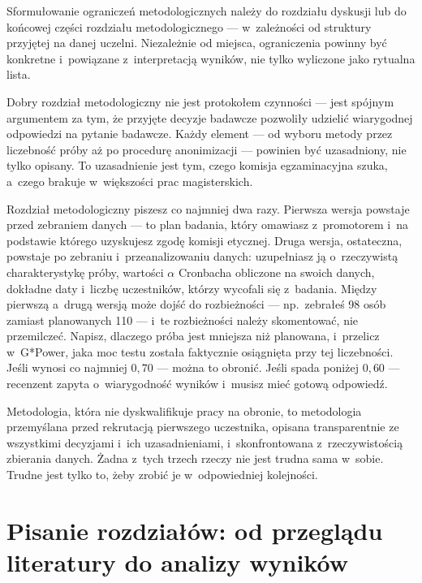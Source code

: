 \documentclass[12pt,a4paper,twoside,openany]{book}
\begin{document}
Sformułowanie ograniczeń metodologicznych należy do rozdziału dyskusji lub do końcowej części rozdziału metodologicznego --- w~zależności od struktury przyjętej na danej uczelni. Niezależnie od miejsca, ograniczenia powinny być konkretne i~powiązane z~interpretacją wyników, nie tylko wyliczone jako rytualna lista.

\begin{keyinsight}
Dobry rozdział metodologiczny nie jest protokołem czynności --- jest spójnym argumentem za tym, że przyjęte decyzje badawcze pozwoliły udzielić wiarygodnej odpowiedzi na pytanie badawcze. Każdy element --- od wyboru metody przez liczebność próby aż po procedurę anonimizacji --- powinien być uzasadniony, nie tylko opisany. To uzasadnienie jest tym, czego komisja egzaminacyjna szuka, a~czego brakuje w~większości prac magisterskich.
\end{keyinsight}

Rozdział metodologiczny piszesz co najmniej dwa razy. Pierwsza wersja powstaje przed zebraniem danych --- to plan badania, który omawiasz z~promotorem i~na podstawie którego uzyskujesz zgodę komisji etycznej. Druga wersja, ostateczna, powstaje po zebraniu i~przeanalizowaniu danych: uzupełniasz ją o~rzeczywistą charakterystykę próby, wartości $\alpha$ Cronbacha obliczone na swoich danych, dokładne daty i~liczbę uczestników, którzy wycofali się z~badania. Między pierwszą a~drugą wersją może dojść do rozbieżności --- np.\ zebrałeś 98 osób zamiast planowanych 110 --- i~te rozbieżności należy skomentować, nie przemilczeć. Napisz, dlaczego próba jest mniejsza niż planowana, i~przelicz w~G*Power, jaka moc testu została faktycznie osiągnięta przy tej liczebności. Jeśli wynosi co najmniej $0{,}70$ --- można to obronić. Jeśli spada poniżej $0{,}60$ --- recenzent zapyta o~wiarygodność wyników i~musisz mieć gotową odpowiedź.

Metodologia, która nie dyskwalifikuje pracy na obronie, to metodologia przemyślana przed rekrutacją pierwszego uczestnika, opisana transparentnie ze wszystkimi decyzjami i~ich uzasadnieniami, i~skonfrontowana z~rzeczywistością zbierania danych. Żadna z~tych trzech rzeczy nie jest trudna sama w~sobie. Trudne jest tylko to, żeby zrobić je w~odpowiedniej kolejności.
\clearpage

\chapter{Pisanie rozdziałów: od przeglądu literatury do analizy wyników}
\end{document}
